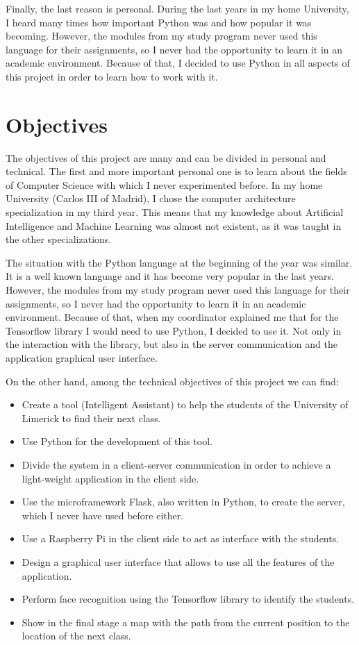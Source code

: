 	Finally, the last reason is personal. During the last years in my home University, I heard many times how important Python was and how popular it was becoming. However, the modules from my study program never used this language for their assignments, so I never had the opportunity to learn it in an academic environment. Because of that, I decided to use Python in all aspects of this project in order to learn how to work with it.  

\section{Objectives}
The objectives of this project are many and can be divided in personal and technical. The first and more important personal one is to learn about the fields of Computer Science with which I never experimented before. In my home University (Carlos III of Madrid), I chose the computer architecture specialization in my third year. This means that my knowledge about Artificial Intelligence and Machine Learning was almost not existent, as it was taught in the other specializations. 

The situation with the Python language at the beginning of the year was similar. It is a well known language and it has become very popular in the last years. However, the modules from my study program never used this language for their assignments, so I never had the opportunity to learn it in an academic environment. Because of that, when my coordinator explained me that for the Tensorflow library I would need to use Python, I decided to use it. Not only in the interaction with the library, but also in the server communication and the application graphical user interface.

On the other hand, among the technical objectives of this project we can find:

\begin{itemize}
	\item Create a tool (Intelligent Assistant) to help the students of the University of Limerick to find their next class.
	\item Use Python for the development of this tool.
	\item Divide the system in a client-server communication in order to achieve a light-weight application in the client side.
	\item Use the microframework Flask, also written in Python, to create the server, which I never have used before either.
	\item Use a Raspberry Pi in the client side to act as interface with the students.
	\item Design a graphical user interface that allows to use all the features of the application.
	\item Perform face recognition using the Tensorflow library to identify the students.
	\item Show in the final stage a map with the path from the current position to the location of the next class.
\end{itemize}

